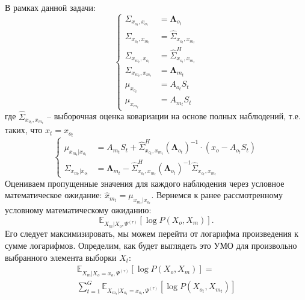 \documentclass[11pt]{article}
\newcommand{\Expect}{\mathbb{E}}
\begin{document}
В рамках данной задачи:
\begin{equation}
\left\{ \begin{aligned} 
\Sigma_{x_{o_t},x_{o_t}} &= \mathbf{\Lambda}_{o_t} \\
\Sigma_{x_{o_t},x_{m_t}} &= \hat{\Sigma}_{x_{o_t},x_{m_t}} \\
\Sigma_{x_{m_t},x_{o_t}} &= \hat{\Sigma}^H_{x_{o_t},x_{m_t}} \\
\Sigma_{x_{m_t},x_{m_t}} &= \mathbf{\Lambda}_{m_t} \\
\mu_{x_{o_t}} &= A_{o_t}S_t \\
\mu_{x_{m_t}} &= A_{m_t}S_t
\end{aligned} \right.
\end{equation}
где $\hat{\Sigma}_{x_{o_t},x_{m_t}}$ -- выборочная оценка ковариации на основе полных наблюдений, т.е. таких, что $x_t = x_{o_t}$
\begin{equation}
\left\{ \begin{aligned} 
\mu_{x_{m_t}|x_{o_t}} &= A_{m_t}S_t + \hat{\Sigma}^H_{x_{o_t},x_{m_t}}(\mathbf{\Lambda}_{o_t})^{-1}\cdot(x_o-A_{o_t}S_t) \\
\Sigma_{x_{m_t}|x_{o_t}} &= \mathbf{\Lambda}_{m_t}-\hat{\Sigma}^H_{x_{o_t},x_{m_t}}(\mathbf{\Lambda}_{o_t})^{-1}\hat{\Sigma}_{x_{o_t},x_{m_t}}
\end{aligned} \right.
\end{equation}
Оцениваем пропущенные значения для каждого наблюдения через условное математическое ожидание:
$\hat{x}_{m_t} = \mu_{x_{m_t}|x_{o_t}}$.
Вернемся к ранее рассмотренному условному математическому ожиданию:
\begin{equation*}
 \Expect_{X_m|X_o, \Psi^{(\tau)}}[\log P(X_o, X_m)].
\end{equation*}
Его следует максимизировать, мы можем перейти от логарифма произведения к сумме логарифмов. Определим, как будет выглядеть это УМО для произвольно выбранного элемента выборки $X_t$:
\begin{equation*}
\begin{gathered}
 \Expect_{X_m|X_o=x_o, \Psi^{(\tau)}}[\log P(X_o, X_m)] = \\
 \sum_{t=1}^G\Expect_{X_{m_t}|X_{o_t}=x_{o_t}, \Psi^{(\tau)}}[\log P(X_{o_t}, X_{m_t})]
\end{gathered}
\end{equation*}
\\
\\
\end{document}
